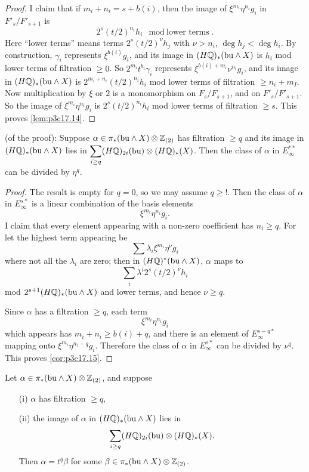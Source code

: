 \documentclass[../main]{subfiles}
\begin{document}
\begin{proof}
I claim that if $m_i + n_i = s + b(i)$, then the image of $\xi^{m_i} \eta^{n_i} g_i$ in $F'_s/F'_{s + 1}$ is \[2^s (t/2)^{n_i} h_i \mod \text{lower terms}.\] Here ``lower terms'' means terms $2^s(t/2)^\nu h_j$ with $\nu > n_i$, $\deg h_j < \deg h_i$. By construction, $\gamma_i$ represents $\xi^{b(i)} g_i$, and its image in $(H\mathbb{Q})_\ast(\mathrm{bu} \wedge X)$ is $h_i$ mod lower terms of filtration $\ge 0$. So $2^{m_i} t^{b_i} \gamma_i$ represents $\xi^{b(i) + m_i} \nu^{n_i} g_i$, and its image in $(H \mathbb{Q})_\ast(\mathrm{bu} \wedge X)$ is $2^{m_i + n_i}(t/2)^{n_i} h_i$ mod lower terms of filtration $\ge n_i + m_I$. Now multiplication by $\xi$ or $2$ is a monomorphism on $F_s/F_{s + 1}$, and on $F'_s/F'_{s + 1}$. So the image of $\xi^{m_i} \eta^{n_i} g_i$ is $2^s(t/2)^{n_i} h_i$ mod lower terms of filtration $\ge s$. This proves \ref{lem:p3c17.14}. 
\end{proof}

\begin{corollary}
\label{cor:p3c17.15}
(of the proof): Suppose $\alpha \in \pi_\ast(\mathrm{bu} \wedge X) \otimes \mathbb{Z}_{(2)}$ has filtration $\ge q$ and its image in $(H\mathbb{Q})_\ast(\mathrm{bu} \wedge X)$ lies in $\displaystyle \sum_{i \ge q} (H \mathbb{Q})_{2i}(\mathrm{bu}) \otimes (H \mathbb{Q})_\ast(X)$. Then the class of $\alpha$ in $E_\infty^{\ast \ast}$ can be divided by $\eta^q$. 
\end{corollary}
\begin{proof}
The result is empty for $q = 0$, so we may assume $q \ge !$. Then the class of $\alpha$ in $E_\infty^{s\ast}$ is a linear combination of the basis elements \[\xi^{m_i} \eta^{n_i} g_i.\] I claim that every element appearing with a non-zero coefficient has $n_i \ge q$. For let the highest term appearing be \[\sum \lambda_i \xi^{m_i} \eta^\nu g_i\] where not all the $\lambda_i$ are zero; then in $(H\mathbb{Q})^\ast(\mathrm{bu} \wedge X)$, $\alpha$ maps to \[\sum_i \lambda^i 2^s (t/2)^\nu h_i\] mod $2^{s + 1}(H \mathbb{Q})_\ast(\mathrm{bu} \wedge X)$ and lower terms, and hence $\nu \ge q$.

Since $\alpha$ has a filtration $\ge q$, each term \[\xi^{m_i} \eta^{n_i} g_i\] which appears has $m_i + n_i \ge b(i) + q$, and there is an element of $E_\infty^{s - q\ast}$ mapping onto $\xi^{m_i} \eta^{n_i - q}g_i$. Therefore the class of $\alpha$ in $E^{s\ast}_\infty$ can be divided by $\nu^q$. This proves \ref{cor:p3c17.15}. 
\end{proof}

\begin{lemma}
\label{lem:p3c17.16}
Let $\alpha \in \pi_\ast(\mathrm{bu} \wedge X) \otimes \mathbb{Z}_{(2)}$, and suppose 

\begin{enumerate}
    \item[(i)] $\alpha$ has filtration $\ge q$, 
    \item[(ii)] the image of $\alpha$ in $(H \mathbb{Q})_\ast(\mathrm{bu} \wedge X)$ lies in \[\sum_{i \ge q} (H \mathbb{Q})_{2i}(\mathrm{bu}) \otimes (H \mathbb{Q})_\ast(X).\] Then $\alpha = t^q \beta$ for some $\beta \in \pi_\ast(\mathrm{bu} \wedge X) \otimes \mathbb{Z}_{(2)}$.
\end{enumerate}
\end{lemma}
\end{document}

